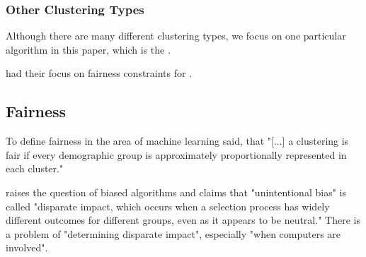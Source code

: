 \subsubsection{Other Clustering Types}

Although there are many different clustering types, we focus on one particular algorithm in this paper, which is the .

\textcite[]{Kleindessner2019} had their focus on fairness constraints for .


\subsection{Fairness}

To define fairness in the area of machine learning \textcite[1]{Kleindessner2019} said, that "[...] a clustering is fair if every demographic group is approximately proportionally represented in each cluster."

\textcite[1]{Feldman2014CertifyingImpact} raises the question of biased algorithms and claims that "unintentional bias" is called "disparate impact, which occurs when a selection process has widely different outcomes for different groups, even as it appears to be neutral." There is a problem of "determining disparate impact", especially "when computers are involved".

